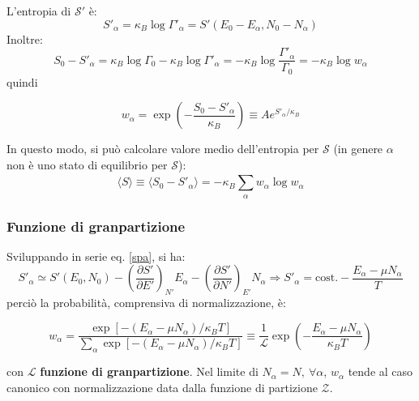 \documentclass[10pt, a4paper]{scrartcl}
\numberwithin{equation}{subsection}
\theoremstyle{style1}
\theoremstyle{style2}
\newenvironment{boxenv}[1][]{
    \begin{eqbox}[#1]
    }{
   \end{eqbox}
}
\begin{document}
L'entropia di $\mathscr{S}'$ \`e:
\begin{equation}\label{spa}
	S'_\alpha = \kappa _B \log \Gamma'_\alpha  = S'(E_0 - E_\alpha , N_0 - N_\alpha )
\end{equation}
Inoltre:
\begin{equation}
	S_0 - S'_\alpha  = \kappa _B \log \Gamma_0 - \kappa _B \log \Gamma'_\alpha = - \kappa _B \log \frac{\Gamma'_\alpha }{\Gamma_0} = -\kappa _B \log w_\alpha 
\end{equation}
quindi
\begin{boxenv}[]
\begin{equation}
	w_\alpha  = \exp \left(-\frac{S_0-S'_\alpha }{\kappa _B}\right) \equiv A e^{S'_\alpha  / \kappa _B} 
\end{equation}
\end{boxenv}
\noindent In questo modo, si pu\`o calcolare valore medio dell'entropia per $\mathscr{S}$ (in genere $\alpha $ non \`e uno stato di equilibrio per $\mathscr{S}$):
\begin{equation}
	\langle S  \rangle \equiv \langle S_0 - S'_\alpha  \rangle = - \kappa _B \sum_{\alpha }^{} w_\alpha  \log w_\alpha 
\end{equation}
\subsubsection{Funzione di granpartizione}
Sviluppando in serie eq. \ref{spa}, si ha:
\begin{equation}
	S'_\alpha  \simeq S'(E_0,N_0) - \left(\frac{\partial S'}{\partial E'} \right) _{N'} E_\alpha - \left(\frac{\partial S'}{\partial N'} \right) _{E'} N_\alpha \Rightarrow S'_\alpha  = \text{cost.} - \frac{E_\alpha - \mu  N_\alpha }{T }
\end{equation}
perci\`o la probabilit\`a, comprensiva di normalizzazione, \`e:
\begin{boxenv}[]
\begin{equation}
	w_\alpha = \frac{\exp \left[ -(E_\alpha  - \mu  N_\alpha ) / \kappa _B T \right] }{\sum_{\alpha }^{} \exp \left[ - (E_\alpha  - \mu  N_\alpha ) / \kappa _B T \right] } \equiv \frac{1}{\mathscr{L}} \exp \left(- \frac{E_\alpha - \mu  N_\alpha }{\kappa _B T}\right) 
\end{equation}
\end{boxenv}
\noindent con $\mathscr{L}$ \textbf{funzione di granpartizione}. Nel limite di $N_\alpha  = N, \ \forall \alpha $, $w_\alpha $ tende al caso canonico con normalizzazione data dalla funzione di partizione $\mathscr{Z}$.
\end{document}
